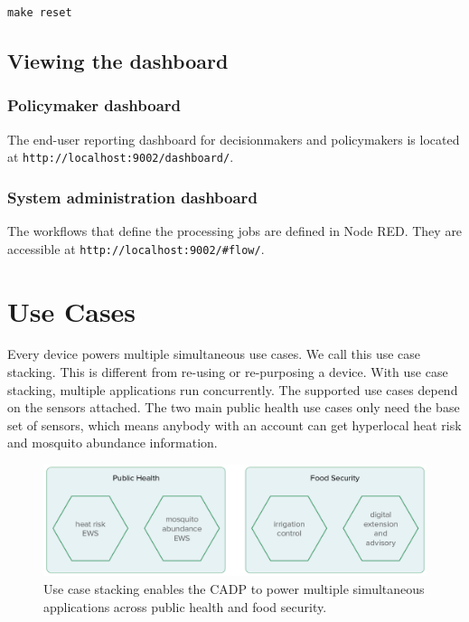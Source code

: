 \documentclass[
]{book}
\begin{document}
\begin{verbatim}
make reset
\end{verbatim}

\hypertarget{viewing-the-dashboard}{%
\section{Viewing the dashboard}\label{viewing-the-dashboard}}

\hypertarget{policymaker-dashboard}{%
\subsection{Policymaker dashboard}\label{policymaker-dashboard}}

The end-user reporting dashboard for decisionmakers and policymakers is
located at \texttt{http://localhost:9002/dashboard/}.

\hypertarget{system-administration-dashboard}{%
\subsection{System administration dashboard}\label{system-administration-dashboard}}

The workflows that define the processing jobs are defined in Node RED.
They are accessible at \texttt{http://localhost:9002/\#flow/}.

\hypertarget{use-cases}{%
\chapter{Use Cases}\label{use-cases}}

Every device powers multiple simultaneous use cases.
We call this use case stacking.
This is different from re-using or re-purposing a device.
With use case stacking, multiple applications run concurrently.
The supported use cases depend on the sensors attached.
The two main public health use cases only need the base set of sensors,
which means anybody with an account can get hyperlocal heat risk
and mosquito abundance information.

\begin{figure}
\centering
\includegraphics[width=.8\linewidth]{images/cadp_applications}
\caption{Use case stacking enables the CADP to power multiple simultaneous applications across public health and food security.}
\label{fig:cadp_applications}
\end{figure}
\end{document}
